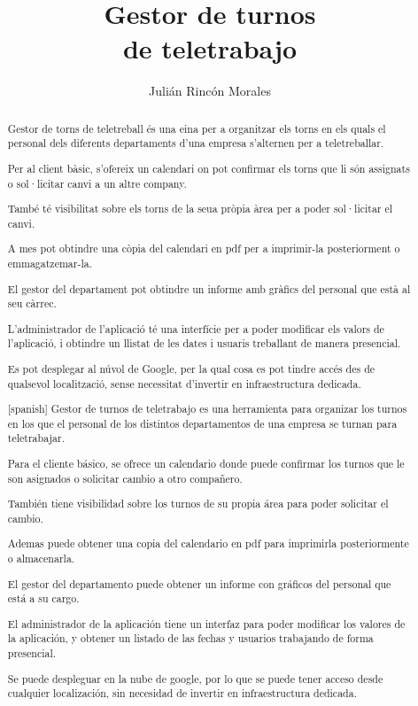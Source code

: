 \documentclass[11pt,spanish,listoffigures,listoftables]{tfgetsinf}
\title{Gestor de turnos  \\
         de teletrabajo}
\author{Julián Rincón Morales}
\begin{document}

\begin{abstract}
Gestor de torns de teletreball és una eina per a organitzar els torns en els quals el personal dels diferents departaments d'una empresa s'alternen per a teletreballar.

Per al client bàsic, s'ofereix un calendari on pot confirmar els torns que li són assignats o sol·licitar canvi a un altre company.

També té visibilitat sobre els torns de la seua pròpia àrea per a poder sol·licitar el canvi.

A mes pot obtindre una còpia del calendari en pdf per a imprimir-la posteriorment o emmagatzemar-la.

El gestor del departament pot obtindre un informe amb gràfics del personal que està al seu càrrec.

L'administrador de l'aplicació té una interfície per a poder modificar els valors de l'aplicació, i obtindre un llistat de les dates i usuaris treballant de manera presencial.

Es pot desplegar al núvol de Google, per la qual cosa es pot tindre accés des de qualsevol localització, sense necessitat d'invertir en infraestructura dedicada.

\end{abstract}

\begin{abstract}[spanish]
Gestor de turnos de teletrabajo es una herramienta para organizar los turnos en los que el personal de los distintos departamentos de una empresa se turnan para teletrabajar.

Para el cliente básico, se ofrece un calendario donde puede confirmar los turnos que le son asignados o solicitar cambio a otro compañero.

También tiene visibilidad sobre los turnos de su propia área para poder solicitar el cambio.

Ademas puede obtener una copia del calendario en pdf para imprimirla posteriormente o almacenarla.

El gestor del departamento puede obtener un informe con gráficos del personal que está a su cargo.

El administrador de la aplicación tiene un interfaz para poder modificar los valores de la aplicación, y obtener un listado de las fechas y usuarios trabajando de forma presencial.

Se puede despleguar en la nube de google, por lo que se puede tener acceso desde cualquier localización, sin necesidad de invertir en infraestructura dedicada.


\end{abstract}
\end{document}
